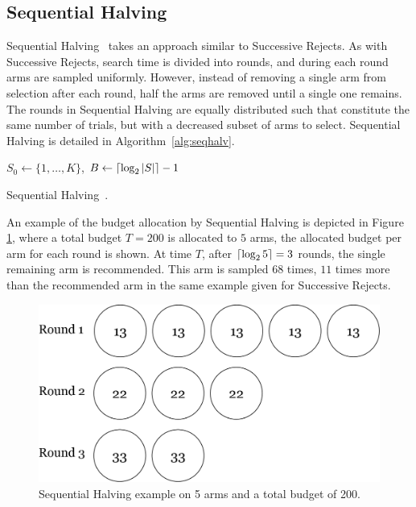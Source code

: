 \documentclass{kecsmstr}
\DeclarePairedDelimiter{\ceil}{\lceil}{\rceil}
\DeclarePairedDelimiter{\floor}{\lfloor}{\rfloor}
\begin{document}
\newpage

\subsection{Sequential Halving}
Sequential Halving~ takes an approach similar to Successive Rejects. As with Successive Rejects, search time is divided into rounds, and during each round arms are sampled uniformly. However, instead of removing a single arm from selection after each round, half the arms are removed until a single one remains. The rounds in Sequential Halving are equally distributed such that constitute the same number of trials, but with a decreased subset of arms to select. Sequential Halving is detailed in Algorithm~\ref{alg:seqhalv}.

\IncMargin{1em}
\begin{algorithm2e}[ht]
	\vspace{0.1cm}
	$S_0 \gets \{1,\dots,K\}$,
	$B \gets \ceil{\log_2{|S|}} - 1$														\;
	\BlankLine
  \caption[Sequential Halving]{Sequential Halving~\protect{}. \label{alg:seqhalv}}
\end{algorithm2e}
\DecMargin{1em}

An example of the budget allocation by Sequential Halving is depicted in Figure \ref{fig:seq-halving}, where a total budget $T = 200$ is allocated to $5$ arms, the allocated budget per arm for each round is shown. At time $T$, after $\ceil{\log_2{5}}=3$ rounds, the single remaining arm is recommended. This arm is sampled $68$ times, $11$ times more than the recommended arm in the same example given for Successive Rejects.

\begin{figure}[ht]
	\centering
	\includegraphics[width=.6\textwidth]{img/seq_halving.png}
	\caption{Sequential Halving example on 5 arms and a total budget of 200.}
	\label{fig:seq-halving}
\end{figure}
\end{document}
